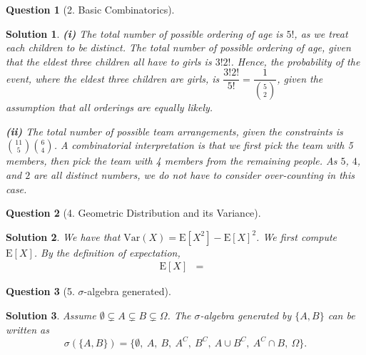 \documentclass{article} %
\theoremstyle{quest}
\newtheorem*{question}{Question}
\newtheorem*{solution}{Solution}
\begin{document}
\begin{question}[2. Basic Combinatorics]
\end{question}
\begin{solution}

\textbf{(i)} The total number of possible ordering of age is $5!$, as we treat each children to be distinct.
The total number of possible ordering of age, given that the eldest three children all have to girls
is $3!2!$. Hence, the probability of the event, where the eldest three children are girls, is 
$\dfrac{3!2!}{5!} = \dfrac{1}{\binom{5}{2}}$, given the assumption that all orderings are equally likely.

\bigskip

\textbf{(ii)}
The total number of possible team arrangements, given the constraints is $\binom{11}{5} \binom{6}{4}$. A 
combinatorial interpretation is that we first pick the team with 5 members, then pick the team with 4 members
from the remaining people. As $5$, $4$, and $2$ are all distinct numbers, we do not have to consider
over-counting in this case.

\end{solution}

\bigskip

\begin{question}[4. Geometric Distribution and its Variance]
\end{question}
\begin{solution}
We have that $\mathrm{Var}(X) = \mathrm{E}[X^2] - \mathrm{E}[X]^2$. We first compute $\mathrm{E}[X]$.
By the definition of expectation,
\begin{eqnarray}
\mathrm{E}[X] &=& 
\end{eqnarray}


\end{solution}

\bigskip

\begin{question}[5. $\sigma$-algebra generated]
\end{question}
\begin{solution}
Assume $\emptyset \subsetneq A \subsetneq B \subsetneq \Omega$.
The $\sigma$-algebra generated by $\{ A, B \}$ can be written as
\[
\sigma( \{ A, B \} ) = \{ \emptyset , \> A , \> B , \> A^C, \> B^C, \> A\cup B^C, \> A^C \cap B, \> \Omega \}.
\]
\end{solution}
\end{document}
